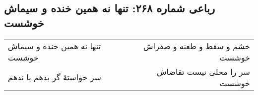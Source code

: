 \begin{center}
\section*{رباعی شماره ۲۶۸: تنها نه همین خنده و سیماش خوشست}
\label{sec:0268}
\begin{longtable}{l p{0.5cm} r}
تنها نه همین خنده و سیماش خوشست
&&
خشم و سقط و طعنه و صفراش خوشست
\\
سر خواستهٔ گر بدهم یا ندهم
&&
سر را محلی نیست تقاضاش خوشست
\\
\end{longtable}
\end{center}
